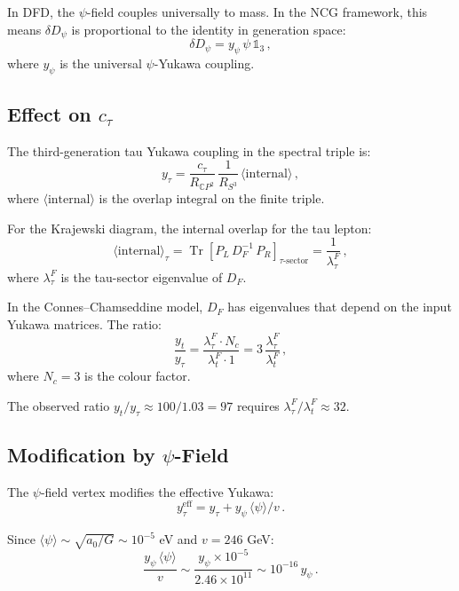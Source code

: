 \documentclass[11pt,a4paper]{article}
\newcommand{\Tr}{\operatorname{Tr}}
\newcommand{\CP}{\mathbb{C}P}
\begin{document}
In DFD, the $\psi$-field couples universally to mass. In the NCG framework, this means $\delta D_\psi$ is proportional to the identity in generation space:
\begin{equation}
\delta D_\psi = y_\psi\,\psi\,\mathbb{1}_3\,,
\end{equation}
where $y_\psi$ is the universal $\psi$-Yukawa coupling.

\subsection{Effect on $c_\tau$}

The third-generation tau Yukawa coupling in the spectral triple is:
\begin{equation}
y_\tau = \frac{c_\tau}{R_{\CP^2}}\,\frac{1}{R_{S^3}}\,\langle\text{internal}\rangle\,,
\end{equation}
where $\langle\text{internal}\rangle$ is the overlap integral on the finite triple.

For the Krajewski diagram, the internal overlap for the tau lepton:
\begin{equation}
\langle\text{internal}\rangle_\tau = \Tr\left[P_L\,D_F^{-1}\,P_R\right]_{\tau\text{-sector}} = \frac{1}{\lambda_\tau^F}\,,
\end{equation}
where $\lambda_\tau^F$ is the tau-sector eigenvalue of $D_F$.

In the Connes--Chamseddine model, $D_F$ has eigenvalues that depend on the input Yukawa matrices. The ratio:
\begin{equation}
\frac{y_t}{y_\tau} = \frac{\lambda_\tau^F \cdot N_c}{\lambda_t^F \cdot 1} = 3\,\frac{\lambda_\tau^F}{\lambda_t^F}\,,
\end{equation}
where $N_c = 3$ is the colour factor.

The observed ratio $y_t/y_\tau \approx 100/1.03 = 97$ requires $\lambda_\tau^F/\lambda_t^F \approx 32$.

\subsection{Modification by $\psi$-Field}

The $\psi$-field vertex modifies the effective Yukawa:
\begin{equation}
y_\tau^{\mathrm{eff}} = y_\tau + y_\psi\,\langle\psi\rangle/v\,.
\end{equation}

Since $\langle\psi\rangle \sim \sqrt{a_0/G} \sim 10^{-5}$ eV and $v = 246$ GeV:
\begin{equation}
\frac{y_\psi\,\langle\psi\rangle}{v} \sim \frac{y_\psi \times 10^{-5}}{2.46 \times 10^{11}} \sim 10^{-16}\,y_\psi\,.
\end{equation}
\end{document}
